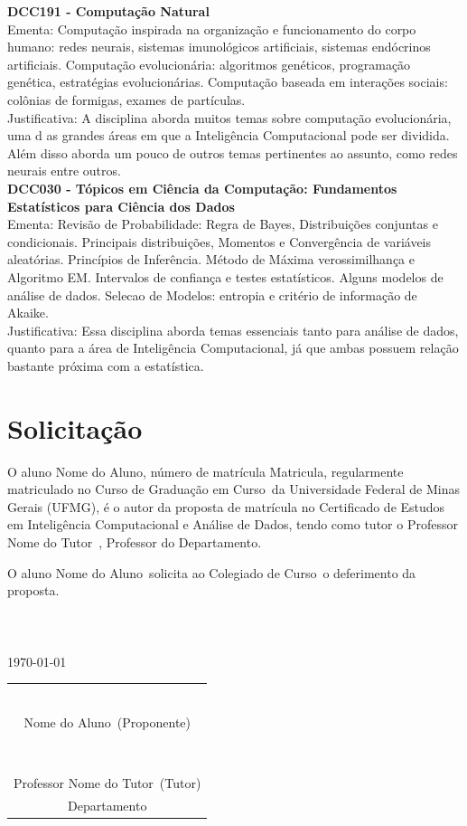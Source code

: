 \documentclass{article}
\newcommand{\aluno}{Nome do Aluno}
\newcommand{\tutor}{Nome do Tutor}
\newcommand{\departamento}{Departamento}
\newcommand{\matricula}{Matricula}
\newcommand{\curso}{Curso} %
\begin{document}
	\textbf{DCC191 - Computação Natural} \\
	Ementa: Computação inspirada na organização e funcionamento do corpo humano: redes neurais, sistemas imunológicos artificiais, sistemas endócrinos artificiais. Computação evolucionária: algoritmos genéticos, programação genética, estratégias evolucionárias. Computação baseada em interações sociais: colônias de formigas, exames de partículas. \\
	Justificativa: A disciplina aborda muitos temas sobre computação evolucionária, uma d as grandes áreas em que a Inteligência Computacional pode ser dividida. Além disso aborda um pouco de outros temas pertinentes ao assunto, como redes neurais entre outros. \\
	\textbf{DCC030 - Tópicos em Ciência da Computação: Fundamentos Estatísticos para Ciência dos Dados} \\
	Ementa: Revisão de Probabilidade: Regra de Bayes, Distribuições conjuntas e condicionais. Principais distribuições, Momentos e Convergência de variáveis aleatórias. Princípios de Inferência. Método de Máxima verossimilhança e Algoritmo EM. Intervalos de confiança e testes estatísticos. Alguns modelos de análise de dados. Selecao de Modelos: entropia e critério de informação de Akaike.\\
	Justificativa: Essa disciplina aborda temas essenciais tanto para análise de dados, quanto para a área de Inteligência Computacional, já que ambas possuem relação bastante próxima com a estatística.\\
	
	\pagebreak
	
	\section{Solicitação} \label{sec:Sol}
	O aluno \aluno, número de matrícula \matricula, regularmente matriculado no Curso de Graduação em \curso \ da Universidade Federal de Minas Gerais (UFMG), é o autor da proposta de matrícula no Certificado de Estudos em Inteligência Computacional e Análise de Dados, tendo como tutor o Professor \tutor \ , Professor do \departamento. \par
	O aluno \aluno \  solicita ao Colegiado de \curso \ o deferimento da proposta. 
	\\ \\ \\ \\
	
	\centering \today
	
	\begin{tabular}{c}
		\\ \\ \\ \\	\\ \\
		\hline
		\\
		\aluno \ (Proponente) \\
		\\ \\ \\ \\ \\ \\ \\
		\hline
		\\
		Professor \tutor \ (Tutor)\\
		\departamento
	\end{tabular}
	
\end{document}
